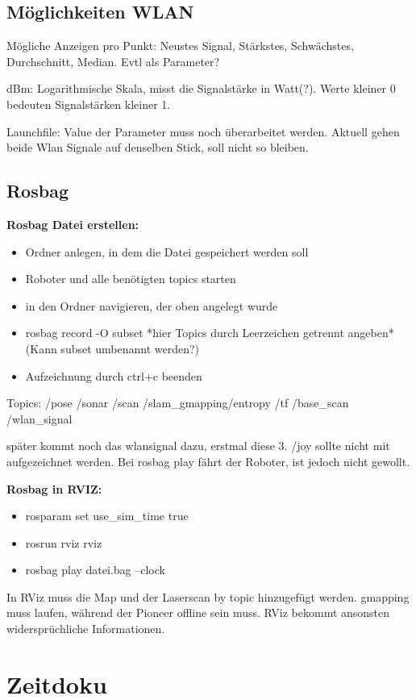 \documentclass{scrartcl}%
\begin{document}
\subsection{Möglichkeiten WLAN}
Mögliche Anzeigen pro Punkt: Neustes Signal, Stärkstes, Schwächstes, Durchschnitt, Median. Evtl als Parameter?

dBm: Logarithmische Skala, misst die Signalstärke in Watt(?). Werte kleiner 0 bedeuten Signalstärken kleiner 1.

Launchfile: Value der Parameter muss noch überarbeitet werden. Aktuell gehen beide Wlan Signale auf denselben Stick, soll nicht so bleiben.

\subsection{Rosbag}
\textbf{Rosbag Datei erstellen:}
\begin{itemize}
	\item Ordner anlegen, in dem die Datei gespeichert werden soll
	\item Roboter und alle benötigten topics starten
	\item in den Ordner navigieren, der oben angelegt wurde
	\item rosbag record -O subset *hier Topics durch Leerzeichen getrennt angeben* (Kann subset umbenannt werden?)
	\item Aufzeichnung durch ctrl+c beenden
\end{itemize}
Topics: /pose /sonar /scan /slam\_gmapping/entropy /tf /base\_scan /wlan\_signal

später kommt noch das wlansignal dazu, erstmal diese 3.
/joy sollte nicht mit aufgezeichnet werden. Bei rosbag play fährt der Roboter, ist jedoch nicht gewollt.

\textbf{Rosbag in RVIZ:}
\begin{itemize}
	\item rosparam set use\_sim\_time true
	\item rosrun rviz rviz
	\item rosbag play datei.bag --clock
\end{itemize}

In RViz muss die Map und der Laserscan by topic hinzugefügt werden. gmapping muss laufen, während der Pioneer offline sein muss. RViz bekommt ansonsten widersprüchliche Informationen.

\section{Zeitdoku}
\end{document}
